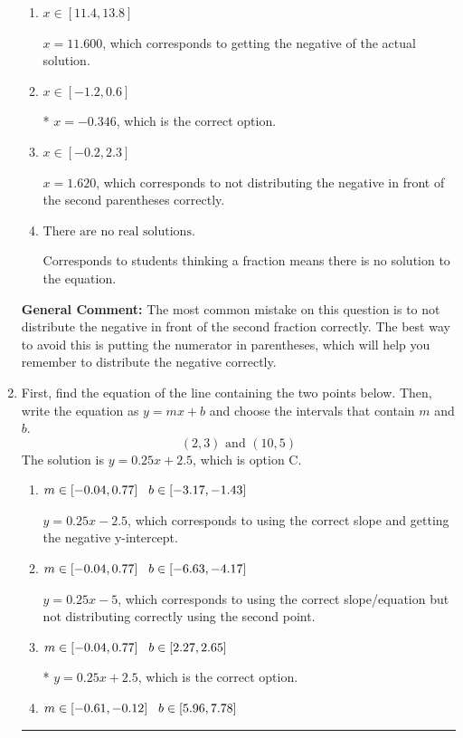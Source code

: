 \documentclass{extbook}[14pt]
\newcommand{\litem}[1]{\item #1

\rule{\textwidth}{0.4pt}}
\begin{document}
\begin{enumerate}
{\begin{enumerate}[label=\Alph*.]
$x = -1.620$, which corresponds to not distributing the negative in front of the first parentheses correctly.
\item \( x \in [11.4, 13.8] \)

$x = 11.600$, which corresponds to getting the negative of the actual solution.
\item \( x \in [-1.2, 0.6] \)

* $x = -0.346$, which is the correct option.
\item \( x \in [-0.2, 2.3] \)

$x = 1.620$, which corresponds to not distributing the negative in front of the second parentheses correctly.
\item \( \text{There are no real solutions.} \)

Corresponds to students thinking a fraction means there is no solution to the equation.
\end{enumerate}

\textbf{General Comment:} The most common mistake on this question is to not distribute the negative in front of the second fraction correctly. The best way to avoid this is putting the numerator in parentheses, which will help you remember to distribute the negative correctly.
}
\litem{
First, find the equation of the line containing the two points below. Then, write the equation as $ y=mx+b $ and choose the intervals that contain $m$ and $b$.
\[ (2, 3) \text{ and } (10, 5) \]The solution is \( y = 0.25x + 2.5 \), which is option C.\begin{enumerate}[label=\Alph*.]
\item \( m \in [-0.04, 0.77] \hspace*{3mm} b \in [-3.17, -1.43] \)

 $y = 0.25x -2.5$, which corresponds to using the correct slope and getting the negative y-intercept.
\item \( m \in [-0.04, 0.77] \hspace*{3mm} b \in [-6.63, -4.17] \)

 $y = 0.25x -5$, which corresponds to using the correct slope/equation but not distributing correctly using the second point.
\item \( m \in [-0.04, 0.77] \hspace*{3mm} b \in [2.27, 2.65] \)

* $y = 0.25x + 2.5$, which is the correct option.
\item \( m \in [-0.61, -0.12] \hspace*{3mm} b \in [5.96, 7.78] \)


\end{enumerate}}
\end{enumerate}
\end{document}

